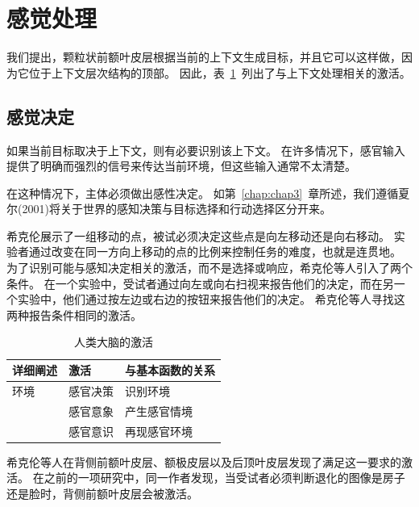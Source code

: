 \section{感觉处理}

我们提出，颗粒状前额叶皮层根据当前的上下文生成目标，并且它可以这样做，因为它位于上下文层次结构的顶部。
因此，表~\ref{tab:9_1}~列出了与上下文处理相关的激活。



\subsection{感觉决定}
\par

如果当前目标取决于上下文，则有必要识别该上下文。
在许多情况下，感官输入提供了明确而强烈的信号来传达当前环境，但这些输入通常不太清楚。


在这种情况下，主体必须做出感性决定。
如第~\ref{chap:chap3}~章所述，我们遵循夏尔(2001)将关于世界的感知决策与目标选择和行动选择区分开来。


希克伦\cite{heekeren2006involvement}展示了一组移动的点，被试必须决定这些点是向左移动还是向右移动。
实验者通过改变在同一方向上移动的点的比例来控制任务的难度，也就是连贯地。
为了识别可能与感知决定相关的激活，而不是选择或响应，希克伦等人引入了两个条件。
在一个实验中，受试者通过向左或向右扫视来报告他们的决定，而在另一个实验中，他们通过按左边或右边的按钮来报告他们的决定。
希克伦等人寻找这两种报告条件相同的激活。
\par


\begin{table}[htbp] 
	\newcommand{\tabincell}[2]{\begin{tabular}{@{}#1@{}}#2\end{tabular}} %
	\centering
	\caption{人类大脑的激活\label{tab:9_1}}
	\renewcommand\arraystretch{1.5}	%
	\begin{tabular}{lll}
		\toprule
		详细阐述 & 激活 & 与基本函数的关系\\
		\midrule
		 环境& 感官决策 & 识别环境  \\
		 & 感官意象 & 产生感官情境 \\
		&  感官意识 & 再现感官环境\\
				\bottomrule
	
	\end{tabular}%
\end{table}%


希克伦等人在背侧前额叶皮层、额极皮层以及后顶叶皮层发现了满足这一要求的激活。
在之前的一项研究中\cite{heekeren2004general}，同一作者发现，当受试者必须判断退化的图像是房子还是脸时，背侧前额叶皮层会被激活。
\par


